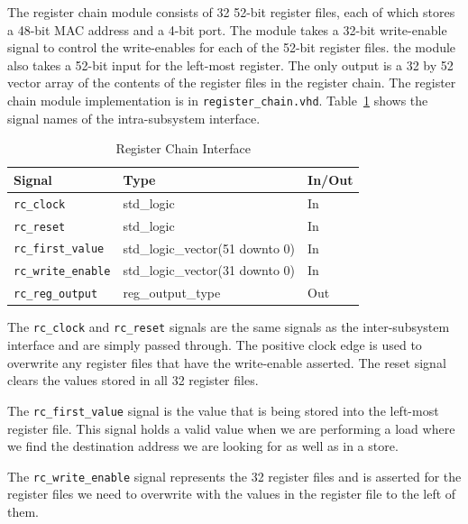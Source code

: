 \documentclass{article}
\begin{document}
The register chain module consists of 32 52-bit register files, each of which stores a 48-bit MAC address and a 4-bit port. The module takes a 32-bit write-enable signal to control the write-enables for each of the 52-bit register files. the module also takes a 52-bit input for the left-most register. The only output is a 32 by 52 vector array of the contents of the register files in the register chain. The register chain module implementation is in \texttt{register\_chain.vhd}. Table~\ref{tab:reg} shows the signal names of the intra-subsystem interface. 


\begin{table}[ht]
    \begin{center}
        \begin{tabular}{lll}\hline
        Signal & Type & In/Out \\
        \hline
        \texttt{rc\_clock} & std\_logic & In \\
        \hline
        \texttt{rc\_reset} & std\_logic & In \\
        \hline
        \texttt{rc\_first\_value} & std\_logic\_vector(51 downto 0) & In \\
        \hline
        \texttt{rc\_write\_enable} & std\_logic\_vector(31 downto 0) & In \\
        \hline
        \texttt{rc\_reg\_output} & reg\_output\_type & Out \\
        \hline
        \end{tabular}
        \caption{Register Chain Interface}\label{tab:reg}
    \end{center}
\end{table}

The \texttt{rc\_clock} and \texttt{rc\_reset} signals are the same signals as the inter-subsystem interface and are simply passed through. The positive clock edge is used to overwrite any register files that have the write-enable asserted. The reset signal clears the values stored in all 32 register files.

The \texttt{rc\_first\_value} signal is the value that is being stored into the left-most register file. This signal holds a valid value when we are performing a load where we find the destination address we are looking for as well as in a store. 

The \texttt{rc\_write\_enable} signal represents the 32 register files and is asserted for the register files we need to overwrite with the values in the register file to the left of them. 
\end{document}

